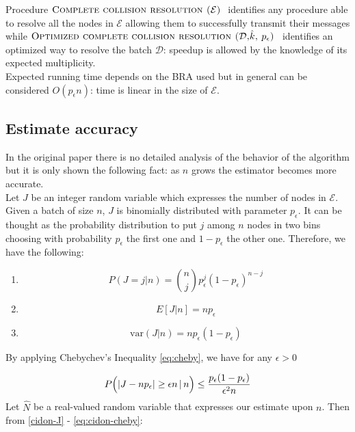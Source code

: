 \documentclass[12pt,a4paper]{report}
\newcommand{\pc}{p_{\epsilon}}
\newcommand{\algname}[1]{\ensuremath{\mbox{\sc #1}}}
\begin{document}
 Procedure \algname{Complete collision resolution ($\mathcal{E}$) } identifies any procedure able to resolve all the nodes in $\mathcal{E}$ allowing them to successfully transmit their messages while \algname{Optimized complete collision resolution ($\mathcal{D}$,$\hat{k}$, $\pc$) } identifies an optimized way to resolve the batch $\mathcal{D}$: speedup is allowed by the knowledge of its expected multiplicity.\\
 
 Expected running time depends on the BRA used but in general can be considered $O(\pc n)$: time is linear in the size of $\mathcal{E}$.

\subsection{Estimate accuracy}
\label{cidon-estimate-accuracy}

In the original paper \cite{cidon} there is no detailed analysis of the behavior of the algorithm but it is only shown the following fact: as $n$ grows the estimator becomes more accurate.\\
    
Let $J$ be an integer random variable which expresses the number of nodes in $\mathcal{E}$. Given a batch of size $n$, $J$ is binomially distributed with parameter $\pc$. It can be thought as the probability distribution to put $j$ among  $n$ nodes in two bins choosing with probability $\pc$ the first one and $1-\pc$ the other one.  Therefore, we have the following:

\begin{enumerate}[1)]
\item \begin{equation}P(J=j|n)={n \choose j}\pc^{j}(1-\pc)^{n-j}
           \label{cidon-J}\end{equation}
\item \begin{equation}E[J|n]=n\pc\label{cidon-e-estimate}\end{equation}
\item \begin{equation}\textrm{var}(J|n)=n\pc(1-\pc)\end{equation}
\end{enumerate}

By applying Chebychev's Inequality \eqref{eq:cheby},  we have for any $\epsilon>0$
 
 \begin{equation}
P\Bigl( \left| J-n\pc\right| \geq \epsilon n \,|\, n \Bigr) \leq \frac{\pc(1-\pc)}{\epsilon^{2}n}
\label{eq:cidon-cheby}
 \end{equation}
 Let $\hat{N}$ be a real-valued random variable that expresses our estimate upon $n$. Then from \eqref{cidon-J} - \eqref{eq:cidon-cheby}:
\end{document}
